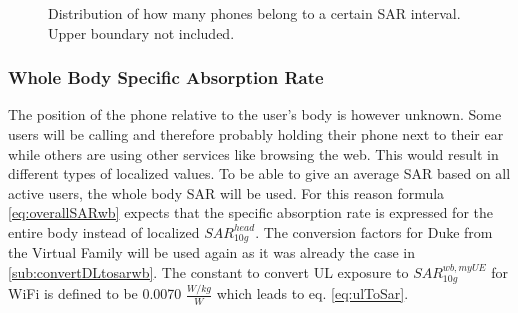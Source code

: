 

\begin{figure}
  \caption{Distribution of how many phones belong to a certain SAR interval. Upper boundary not included.}
  \label{chart:germanDatabase}
\end{figure}


\subsubsection{Whole Body Specific Absorption Rate}
The position of the phone relative to the user's body is however unknown. 
Some users will be calling and therefore probably holding their phone next to their ear while others are using other services like browsing the web. 
This would result in different types of localized values. To be able to give an average SAR based on all active users, the whole body SAR will be used.
For this reason formula \ref{eq:overallSARwb} expects that the specific absorption rate is expressed for the entire body instead of localized $SAR^{head}_{10g}$.
The conversion factors for Duke from the Virtual Family will be used again as it was already the case in \ref{sub:convertDLtosarwb}. 
The constant to convert \gls{UL} exposure to $SAR^{wb,myUE}_{10g}$
for WiFi is defined to be 0.0070 $\frac{W/kg}{W}$ \cite{J22_plets2015joint} which leads to eq. \ref{eq:ulToSar}.

